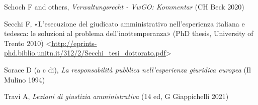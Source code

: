 \documentclass[12pt,it,a4paper,]{report}
\newlength{\cslhangindent}
\newenvironment{CSLReferences}[2] %
 {%
  \setlength{\parindent}{0pt}
  \ifodd #1 \everypar{\setlength{\hangindent}{\cslhangindent}}\ignorespaces\fi
  \ifnum #2 > 0
  \setlength{\parskip}{#2\baselineskip}
  \fi
 }%
 {}
\begin{document}
\begin{CSLReferences}{0}{0}
\leavevmode{}%
Schoch F and others, \emph{Verwaltungsrecht - VwGO: Kommentar} (CH Beck
2020)

\leavevmode{}%
Secchi F, {«L'esecuzione del giudicato amministrativo nell'esperienza
italiana e tedesca: le soluzioni al problema dell'inottemperanza»} (PhD
thesis, University of Trento 2010)
\textless{}\url{http://eprints-phd.biblio.unitn.it/312/2/Secchi_tesi_dottorato.pdf}\textgreater{}

\leavevmode{}%
Sorace D (a c di), \emph{La responsabilità pubblica nell'esperienza
giuridica europea} (Il Mulino 1994)

\leavevmode{}%
Travi A, \emph{Lezioni di giustizia amministrativa} (14 ed, G
Giappichelli 2021)

\end{CSLReferences}
\end{document}

